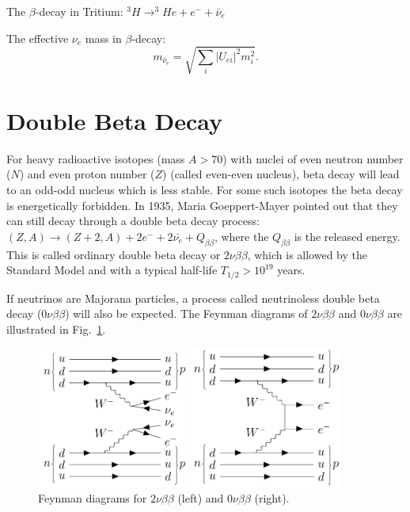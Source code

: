 The $\beta$-decay in Tritium: $^3H\to^3He+e^-+\bar{\nu}_e$

The effective $\nu_e$ mass in $\beta$-decay:
\begin{equation}
m_{\bar{\nu}_e} = \sqrt{\sum_i |U_{ei}|^2 m_i^2}.
\end{equation}


\section{Double Beta Decay}

For heavy radioactive isotopes (mass $A>70$) with nuclei of even neutron number ($N$) and even proton number ($Z$) (called even-even nucleus), beta decay will lead to an odd-odd nucleus which is less stable. For some such isotopes the beta decay is energetically forbidden. In 1935, Maria Goeppert-Mayer pointed out that they can still decay through a double beta decay process: $(Z,A) \to (Z+2,A)+2e^{-}+2\bar{\nu_e}+Q_{\beta\beta}$, where the $Q_{\beta\beta}$ is the released energy. This is called ordinary double beta decay or $2\nu\beta\beta$, which is allowed by the Standard Model and with a typical half-life $T_{1/2}>10^{19}$ years\cite{povh2008particles,martin2019nuclear}.

If neutrinos are Majorana particles, a process called neutrinoless double beta decay ($0\nu\beta\beta$) will also be expected. The Feynman diagrams of $2\nu\beta\beta$ and $0\nu\beta\beta$ are illustrated in Fig.~\ref{feynman1}.

\begin{figure}[htbp]
	\centering	
	\begin{minipage}[t]{0.45\textwidth}
		\includegraphics[width=5cm]{doubleBeta2nu_feynman.png}
	\end{minipage}
	\begin{minipage}[t]{0.45\textwidth}
		\includegraphics[width=5cm]{doubleBeta_feynman.png}
	\end{minipage}
	\caption{ Feynman diagrams for $2\nu\beta\beta$ (left) and $0\nu\beta\beta$ (right).}
	\label{feynman1}
\end{figure}

